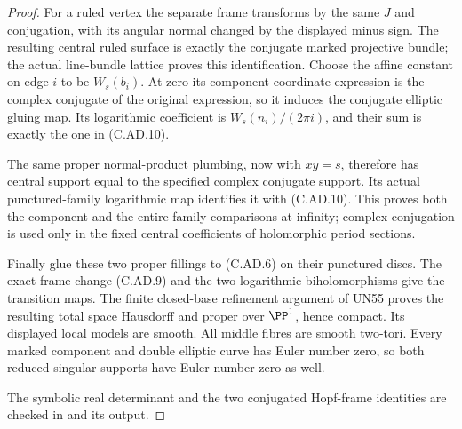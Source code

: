 \begin{proof}
For a ruled vertex the separate frame transforms by the
same $J$ and conjugation, with its angular normal changed
by the displayed minus sign. The resulting central ruled
surface is exactly the conjugate marked projective bundle;
the actual line-bundle lattice proves this identification.
Choose the affine constant on edge $i$ to be $W_s(b_i)$.
At zero its component-coordinate expression is the complex
conjugate of the original expression, so it induces the
conjugate elliptic gluing map. Its logarithmic coefficient
is $W_s(n_i)/(2\pi i)$, and their sum is exactly the one
in (C.AD.10).

The same proper normal-product plumbing, now with $xy=s$,
therefore has central support equal to the specified
complex conjugate support. Its actual punctured-family
logarithmic map identifies it with (C.AD.10). This proves
both the component and the entire-family comparisons at
infinity; complex conjugation is used only in the fixed
central coefficients of holomorphic period sections.

Finally glue these two proper fillings to (C.AD.6) on
their punctured discs. The exact frame change (C.AD.9)
and the two logarithmic biholomorphisms give the transition
maps. The finite closed-base refinement argument of UN55
proves the resulting total space Hausdorff and proper
over $\PP^1$, hence compact. Its displayed local models
are smooth. All middle fibres are smooth two-tori.
Every marked component and double elliptic curve has
Euler number zero, so both reduced singular supports
have Euler number zero as well.

The symbolic real determinant and the two conjugated
Hopf-frame identities are checked in
 and its output.
\end{proof}
